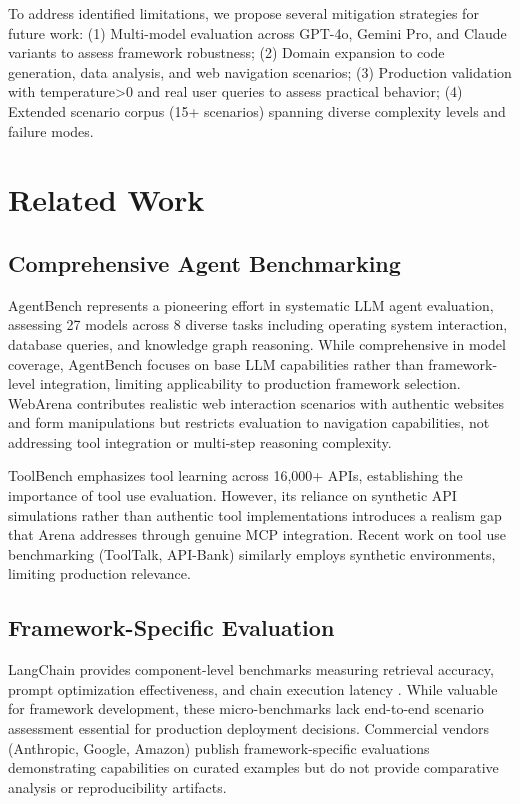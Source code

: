 \documentclass[sigconf,nonacm]{acmart}
\begin{document}
To address identified limitations, we propose several mitigation strategies for future work: (1) Multi-model evaluation across GPT-4o, Gemini Pro, and Claude variants to assess framework robustness; (2) Domain expansion to code generation, data analysis, and web navigation scenarios; (3) Production validation with temperature>0 and real user queries to assess practical behavior; (4) Extended scenario corpus (15+ scenarios) spanning diverse complexity levels and failure modes.

\section{Related Work}

\subsection{Comprehensive Agent Benchmarking}

AgentBench \cite{liu2023agentbench} represents a pioneering effort in systematic LLM agent evaluation, assessing 27 models across 8 diverse tasks including operating system interaction, database queries, and knowledge graph reasoning. While comprehensive in model coverage, AgentBench focuses on base LLM capabilities rather than framework-level integration, limiting applicability to production framework selection. WebArena \cite{zhou2023webarena} contributes realistic web interaction scenarios with authentic websites and form manipulations but restricts evaluation to navigation capabilities, not addressing tool integration or multi-step reasoning complexity.

ToolBench \cite{qin2023toolllm} emphasizes tool learning across 16,000+ APIs, establishing the importance of tool use evaluation. However, its reliance on synthetic API simulations rather than authentic tool implementations introduces a realism gap that Arena addresses through genuine MCP integration. Recent work on tool use benchmarking (ToolTalk, API-Bank) similarly employs synthetic environments, limiting production relevance.

\subsection{Framework-Specific Evaluation}

LangChain provides component-level benchmarks measuring retrieval accuracy, prompt optimization effectiveness, and chain execution latency \cite{langchain2023}. While valuable for framework development, these micro-benchmarks lack end-to-end scenario assessment essential for production deployment decisions. Commercial vendors (Anthropic, Google, Amazon) publish framework-specific evaluations demonstrating capabilities on curated examples but do not provide comparative analysis or reproducibility artifacts.
\end{document}
